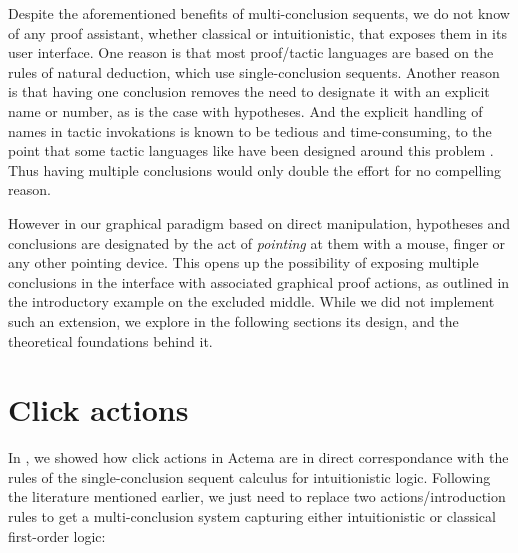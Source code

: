 Despite the aforementioned benefits of multi-conclusion sequents, we do not know
of any proof assistant, whether classical or intuitionistic, that exposes them
in its user interface. One reason is that most proof/tactic languages are based
on the rules of natural deduction, which use single-conclusion sequents. Another
reason is that having one conclusion removes the need to designate it with an
explicit name or number, as is the case with hypotheses. And the explicit handling
of names in tactic invokations is known to be tedious and time-consuming, to the
point that some tactic languages like \ssreflect have been designed around this
problem . Thus having multiple conclusions would only double the
effort for no compelling reason.

However in our graphical paradigm based on direct manipulation, hypotheses and
conclusions are designated by the act of \emph{pointing} at them with a mouse,
finger or any other pointing device. This opens up the possibility of exposing
multiple conclusions in the interface with associated graphical proof actions,
as outlined in the introductory example on the excluded middle. While we did not
implement such an extension, we explore in the following sections its design,
and the theoretical foundations behind it.

\section{Click actions}

In , we showed how click actions in Actema are in direct
correspondance with the rules of the single-conclusion sequent calculus 
for intuitionistic logic. Following the literature mentioned earlier, we just
need to replace two actions/introduction rules to get a multi-conclusion system
capturing either intuitionistic or classical first-order logic:

